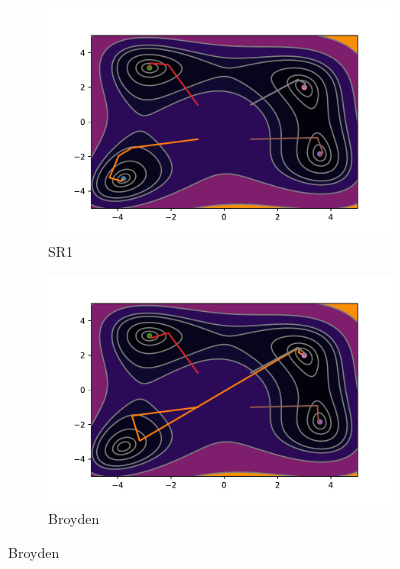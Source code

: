 \begin{figure}[h!]
    \begin{subfigure}{0.5\textwidth}
        \includegraphics[width=\textwidth, trim=1cm 0.5cm 1.3cm 1cm, clip]{assets/SR1/himmelblau.pdf}
        \caption{SR1}
    \end{subfigure}
    \begin{subfigure}{0.5\textwidth}
        \includegraphics[width=\textwidth, trim=1cm 0.5cm 1.3cm 1cm, clip]{assets/Broyden/himmelblau.pdf}
        \caption{Broyden}
    \end{subfigure}
\end{figure}
